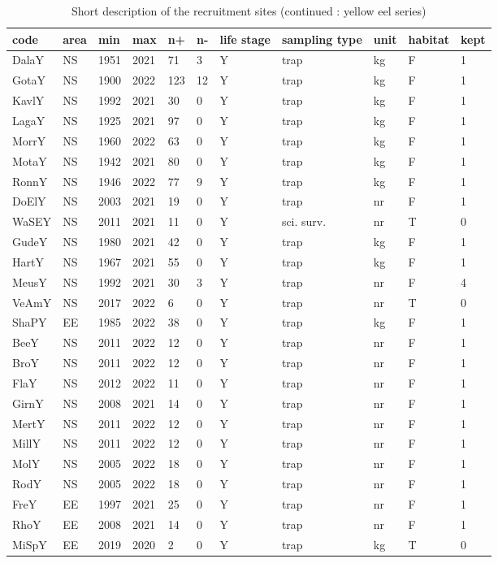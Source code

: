 \begin{table}[htbp]
\centering
\caption{Short description of the recruitment sites (continued : yellow eel series) } 
\label{statseriesY}
\begin{tabular}{p{1cm}p{1cm}p{1cm}p{1cm}p{0.8cm}p{0.8cm}p{1cm}p{2cm}p{2cm}p{1cm}p{1cm}}
  \hline
code & area & min & max & n+ & n- & life stage & sampling type & unit & habitat & kept \\ 
  \hline
DalaY & NS & 1951 & 2021 & 71 & 3 & Y & trap & kg & F & 1 \\ 
  GotaY & NS & 1900 & 2022 & 123 & 12 & Y & trap & kg & F & 1 \\ 
  KavlY & NS & 1992 & 2021 & 30 & 0 & Y & trap & kg & F & 1 \\ 
  LagaY & NS & 1925 & 2021 & 97 & 0 & Y & trap & kg & F & 1 \\ 
  MorrY & NS & 1960 & 2022 & 63 & 0 & Y & trap & kg & F & 1 \\ 
  MotaY & NS & 1942 & 2021 & 80 & 0 & Y & trap & kg & F & 1 \\ 
  RonnY & NS & 1946 & 2022 & 77 & 9 & Y & trap & kg & F & 1 \\ 
  DoElY & NS & 2003 & 2021 & 19 & 0 & Y & trap & nr & F & 1 \\ 
  WaSEY & NS & 2011 & 2021 & 11 & 0 & Y & sci. surv. & nr & T & 0 \\ 
  GudeY & NS & 1980 & 2021 & 42 & 0 & Y & trap & kg & F & 1 \\ 
  HartY & NS & 1967 & 2021 & 55 & 0 & Y & trap & kg & F & 1 \\ 
  MeusY & NS & 1992 & 2021 & 30 & 3 & Y & trap & nr & F & 4 \\ 
  VeAmY & NS & 2017 & 2022 & 6 & 0 & Y & trap & nr & T & 0 \\ 
  ShaPY & EE & 1985 & 2022 & 38 & 0 & Y & trap & kg & F & 1 \\ 
  BeeY & NS & 2011 & 2022 & 12 & 0 & Y & trap & nr & F & 1 \\ 
  BroY & NS & 2011 & 2022 & 12 & 0 & Y & trap & nr & F & 1 \\ 
  FlaY & NS & 2012 & 2022 & 11 & 0 & Y & trap & nr & F & 1 \\ 
  GirnY & NS & 2008 & 2021 & 14 & 0 & Y & trap & nr & F & 1 \\ 
  MertY & NS & 2011 & 2022 & 12 & 0 & Y & trap & nr & F & 1 \\ 
  MillY & NS & 2011 & 2022 & 12 & 0 & Y & trap & nr & F & 1 \\ 
  MolY & NS & 2005 & 2022 & 18 & 0 & Y & trap & nr & F & 1 \\ 
  RodY & NS & 2005 & 2022 & 18 & 0 & Y & trap & nr & F & 1 \\ 
  FreY & EE & 1997 & 2021 & 25 & 0 & Y & trap & nr & F & 1 \\ 
  RhoY & EE & 2008 & 2021 & 14 & 0 & Y & trap & nr & F & 1 \\ 
  MiSpY & EE & 2019 & 2020 & 2 & 0 & Y & trap & kg & T & 0 \\ 
   \hline
\end{tabular}
\end{table}

